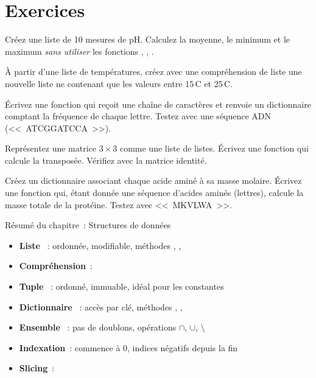 \section{Exercices}

\begin{exercice}
Cr\'eez une liste de 10 mesures de pH. Calculez la moyenne, le minimum et le maximum
\emph{sans utiliser} les fonctions , , .
\end{exercice}

\begin{exercice}
\`A partir d'une liste de temp\'eratures, cr\'eez avec une compr\'ehension de liste
une nouvelle liste ne contenant que les valeurs entre 15\,\textdegree C et 25\,\textdegree C.
\end{exercice}

\begin{exercice}
\'Ecrivez une fonction qui re\c{c}oit une cha\^ine de caract\`eres et renvoie un dictionnaire
comptant la fr\'equence de chaque lettre. Testez avec une s\'equence ADN
(<<~ATCGGATCCA~>>).
\end{exercice}

\begin{exercice}
Repr\'esentez une matrice $3\times 3$ comme une liste de listes. \'Ecrivez une fonction
qui calcule la transpos\'ee. V\'erifiez avec la matrice identit\'e.
\end{exercice}

\begin{exercice}
Cr\'eez un dictionnaire associant chaque acide amin\'e \`a sa masse molaire.
\'Ecrivez une fonction qui, \'etant donn\'ee une s\'equence d'acides amin\'es (lettres),
calcule la masse totale de la prot\'eine. Testez avec <<~MKVLWA~>>.
\end{exercice}

\begin{formules}{R\'esum\'e du chapitre~: Structures de donn\'ees}
\begin{itemize}
    \item \textbf{Liste} \py{[...]}~: ordonn\'ee, modifiable, m\'ethodes ,
    , 
    \item \textbf{Compr\'ehension}~: 
    \item \textbf{Tuple} ~: ordonn\'e, immuable, id\'eal pour les constantes
    \item \textbf{Dictionnaire} ~: acc\`es par cl\'e, m\'ethodes
    , , 
    \item \textbf{Ensemble} ~: pas de doublons, op\'erations $\cap$, $\cup$, $\setminus$
    \item \textbf{Indexation}~: commence \`a 0, indices n\'egatifs depuis la fin
    \item \textbf{Slicing}~: 
\end{itemize}
\end{formules}

